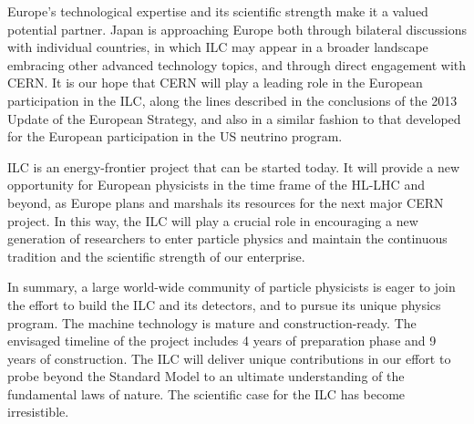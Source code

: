 \documentclass[%
 reprint,
 floatfix,
 amsmath,amssymb,
 aps,
]{revtex4-1}
\begin{document}
 Europe's technological expertise and its scientific strength make it
 a valued potential partner.   Japan is approaching Europe both
 through
bilateral discussions with individual countries, in which  ILC may
 appear in a broader landscape embracing other advanced technology
 topics, and through direct engagement with CERN. 
It is our hope  that CERN will play a leading
role in the European participation in the ILC, along the lines
described in the 
conclusions of the 2013 Update of the European Strategy, and also in a
similar fashion to that  developed for the European participation
in the US  neutrino program.  

ILC is an energy-frontier project that
can be started today.   It will provide a new opportunity for European
physicists in the time frame of the HL-LHC and beyond, as Europe plans
and marshals its resources for the next major CERN project. In this 
way, the ILC will play a crucial role in encouraging a new
generation of researchers to enter particle physics and maintain the
continuous tradition and the scientific strength of our enterprise.

In summary, a large world-wide community of particle physicists is eager to join the effort to build the ILC and its detectors, and to pursue its unique 
physics program. The machine technology is mature and construction-ready. The
envisaged timeline of the project includes 4 years of preparation
phase and 9 years of construction. The ILC will deliver unique contributions in our effort to probe beyond the Standard Model to an ultimate understanding
of the fundamental laws of nature. The scientific case for the ILC
has become irresistible.


\end{document}
